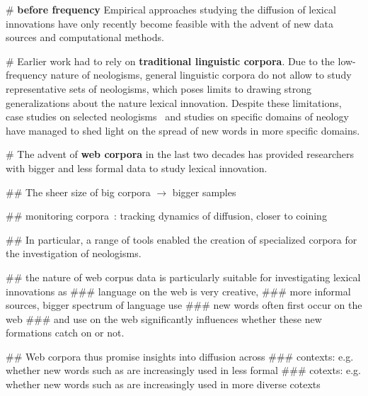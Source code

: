 \documentclass[
  a4paper,
  abstract=on,
  captions=tableabove
  ]{scrartcl}
\renewcommand{\hw}[1]{\textbf{#1}}
\begin{document}
  \begin{easylist}[itemize]

    # \hw{before frequency} Empirical approaches studying the diffusion of lexical innovations have only recently become feasible with the advent of new data sources and computational methods.

    # Earlier work had to rely on \hw{traditional linguistic corpora}. Due to the low-frequency nature of neologisms, general linguistic corpora do not allow to study representative sets of neologisms, which poses limits to drawing strong generalizations about the nature lexical innovation. Despite these limitations, case studies on selected neologisms~\parencite{Hohenhaus2006BouncebackabilityWebascorpusbased} and studies on specific domains of neology~\parencite{Elsen2004Neologismen} have managed to shed light on the spread of new words in more specific domains.

    # The advent of \hw{web corpora} in the last two decades has provided researchers with bigger and less formal data to study lexical innovation.

    ## The sheer size of big corpora $\rightarrow$ bigger samples

    ## monitoring corpora~\parencite{Davies2013CorpusNews}: tracking dynamics of diffusion, closer to coining

    ## In particular, a range of tools enabled the creation of specialized corpora for the investigation of neologisms.~\parencite{Renouf2006WebCorpIntegrated, Kerremans2012NeoCrawlerIdentifying,LemnitzerWortwarte,Gerard2017LogoscopeSemiautomatic,Cartier2017NeoveilleWeb}

    ## the nature of web corpus data is particularly suitable for investigating lexical innovations as
      ### language on the web is very creative,
      ### more informal sources, bigger spectrum of language use
      ### new words often first occur on the web
      ### and use on the web significantly influences whether these new formations catch on or not.

    ## Web corpora thus promise insights into diffusion across
      ### contexts: e.g. whether new words such as  are increasingly used in less formal
      ### cotexts: e.g. whether new words such as  are increasingly used in more diverse cotexts



  \end{easylist}
\end{document}

